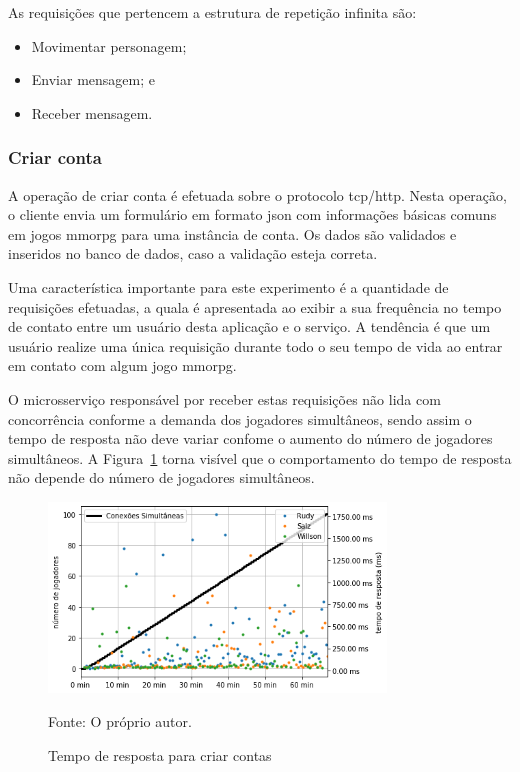 As requisições que pertencem a estrutura de repetição infinita são:

\begin{itemize}
    \item Movimentar personagem;
    \item Enviar mensagem; e
    \item Receber mensagem.
\end{itemize}


\subsubsection{Criar conta}
\label{sec:op_create_account}

A operação de criar conta é efetuada sobre o protocolo \ac{tcp}/\ac{http}.
%
Nesta operação, o cliente envia um formulário em formato \ac{json} com informações básicas comuns em jogos \ac{mmorpg} para uma instância de conta.
%
Os dados são validados e inseridos no banco de dados, caso a validação esteja correta.

Uma característica importante para este experimento é a quantidade de requisições efetuadas, a quala é apresentada ao exibir a sua frequência no tempo de contato entre um usuário desta aplicação e o serviço.
%
A tendência é que um usuário realize uma única requisição durante todo o seu tempo de vida ao entrar em contato com algum jogo \ac{mmorpg}.

O microsserviço responsável por receber estas requisições não lida com concorrência conforme a demanda dos jogadores simultâneos, sendo assim o tempo de resposta não deve variar confome o aumento do número de jogadores simultâneos.
%
A Figura~\ref{fig:create_account_operation_request_time} torna visível que o comportamento do tempo de resposta não depende do número de jogadores simultâneos.

\begin{figure}[htb!]
  \caption{Tempo de resposta para criar contas}
  \label{fig:create_account_operation_request_time}
  \includegraphics[width=0.8\textwidth]{figuras/analise/rt/create_account_operation_request_time.png}
  \centering

  Fonte: O próprio autor.
\end{figure}

